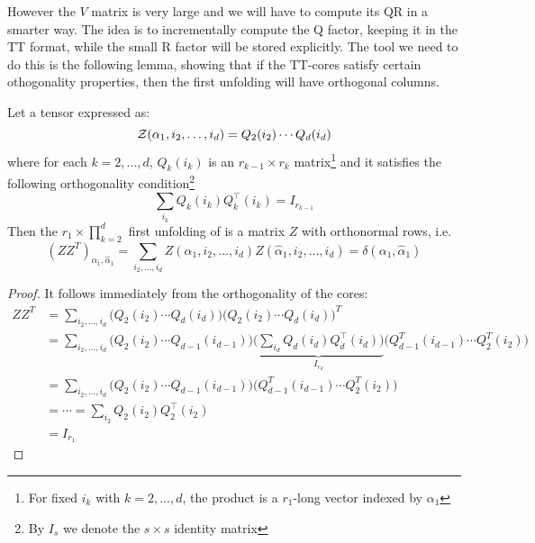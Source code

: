 However the $V$ matrix is very large and we will have to compute its QR in a smarter way. The idea is to incrementally compute the Q factor, keeping it in the TT format, while the small R factor will be stored explicitly. The tool we need to do this is the following lemma, showing that if the TT-cores satisfy certain othogonality properties, then the first unfolding will have orthogonal columns.
\begin{Lemma}
  Let a tensor \Z expressed as:
  \begin{equation*}
    \mathcal{Z}(\alpha_1,i_2,\ldots,i_d) = Q_2(i_2) \cdots Q_d(i_d)
  \end{equation*}
  where for each $k = 2,\ldots,d$, $Q_k(i_k)$ is an $r_{k-1} \times r_k$ matrix\footnote{For fixed $i_k$ with $k=2,\ldots,d$, the product is a $r_1$-long vector indexed by $\alpha_1$} and it satisfies the following orthogonality condition\footnote{By $I_s$ we denote the $s \times s$ identity matrix}
  \begin{equation} \label{eq:orth_cond}
    \sum_{i_k} Q_k(i_k) Q_k^{\top}(i_k) = I_{r_{k-1}}
  \end{equation}
  Then the $r_1 \times \prod_{k=2}^d$ first unfolding of \Z is a matrix $Z$ with orthonormal rows, i.e.
  \begin{equation*}
    (Z Z^T)_{\alpha_1,\hat{\alpha}_1} = \sum_{i_2,\ldots,i_d} Z(\alpha_1,i_2,\ldots,i_d) Z(\hat{\alpha}_1,i_2,\ldots,i_d) = \delta(\alpha_1,\hat{\alpha}_1)
  \end{equation*}

  \begin{proof}
    It follows immediately from the orthogonality of the cores:
    \begin{equation*}
      \begin{split}
        ZZ^T &= \sum_{i_2,\ldots,i_d} \Big( Q_2(i_2) \cdots Q_d(i_d) \Big) \Big( Q_2(i_2) \cdots Q_d(i_d) \Big)^T \\
        &= \sum_{i_2,\ldots,i_d} \Big( Q_2(i_2) \cdots Q_{d-1}(i_{d-1}) \Big)
        \underbrace{\Big( \sum_{i_d} Q_d(i_d) Q_d^{\top}(i_d) \Big)}_{I_{r_d}}
        \Big( Q_{d-1}^T(i_{d-1}) \cdots Q_2^T(i_2) \Big) \\
        &= \sum_{i_2,\ldots,i_d} \Big( Q_2(i_2) \cdots Q_{d-1}(i_{d-1}) \Big)
        \Big( Q_{d-1}^T(i_{d-1}) \cdots Q_2^T(i_2) \Big) \\
        &= \cdots = \sum_{i_2} Q_2(i_2) Q_2^{\top}(i_2) \\
        &= I_{r_1}
      \end{split}
    \end{equation*}
  \end{proof}
\end{Lemma}

